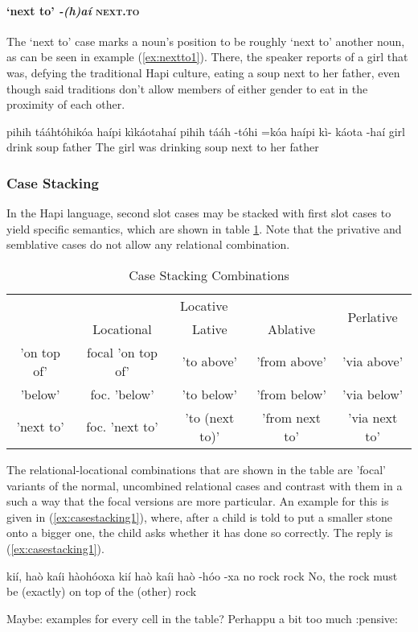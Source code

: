 \documentclass[a4paper, 12pt, oneside]{memoir}
\newcommand{\emh}[1]{\textit{#1}}
\begin{document}
\paragraph{`next to' \emh{-(h)aí} \textsc{next.to}}
The `next to' case marks a noun's position to be roughly `next to' another noun, as can be seen in example (\ref{ex:nextto1}). There, the speaker reports of a girl that was, defying the traditional Hapi culture, eating a soup next to her father, even though said traditions don't allow members of either gender to eat in the proximity of each other.
\begin{examples}
\ex \label{ex:nextto1}
\words pihih tááhtóhikóa haípi kìkáotahaí
\bits pihih tááh -tóhi =kóa haípi kì- káota -haí
\gloss girl drink {\Dpasto} {\Decl} soup {\Tsposs} father {\Next}
\tr The girl was drinking soup next to her father
\end{examples}
\subsubsection{Case
Stacking}\label{scasestacking}
In the Hapi language, second slot cases may be stacked with first slot cases to yield specific semantics, which are shown in table \ref{t:casestacking}. Note that the privative and semblative cases do not allow any relational combination.
\begin{table}[H]
\begin{tabular}{@{}ccccc@{}}
\toprule
\multirow{2}{*}{} & \multicolumn{3}{c}{Locative}                        & \multirow{2}{*}{Perlative} \\ \cmidrule(lr){2-4}
                  & Locational        & Lative         & Ablative       &                            \\ \midrule
'on top of'       & focal 'on top of' & 'to above'     & 'from above'   & 'via above'                \\
'below'           & foc. 'below'      & 'to below'     & 'from below'   & 'via below'                \\
'next to'         & foc. 'next to'    & 'to (next to)' & 'from next to' & 'via next to'              \\ \bottomrule
\end{tabular}
\caption{Case Stacking Combinations}
\label{t:casestacking}
\end{table}
The relational-locational combinations that are shown in the table are 'focal' variants of the normal, uncombined relational cases and contrast with them in a such a way that the focal versions are more particular. An example for this is given in (\ref{ex:casestacking1}), where, after a child is told to put a smaller stone onto a bigger one, the child asks whether it has done so correctly. The reply is (\ref{ex:casestacking1}).
\begin{examples}
\ex \label{ex:casestacking1}
\words kií, haò kaíi hàohóoxa
\bits kií haò kaíi haò -hóo -xa
\gloss no rock {\Cop} rock {\Loc} {\Ont}
\tr No, the rock must be (exactly) on top of the (other) rock
\end{examples}
Maybe: examples for every cell in the table? Perhappu a bit too much :pensive: 
\end{document}
